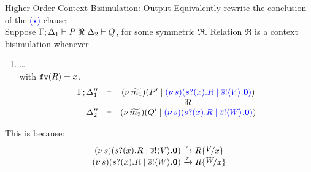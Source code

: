 \documentclass{beamer}
\newcommand{\prcolor}[1]{{\color{blue} #1}}
\begin{document}
	\begin{frame}{Higher-Order Context Bisimulation: Output}
		Equivalently rewrite the conclusion of the \textcolor{blue}{($\star$)} clause:
		\\[2mm]

		Suppose $\Gamma; \Delta_1 \proves P\ \Re\ \Delta_2 \proves Q$, for some symmetric $\Re$. Relation $\Re$ is
		a context bisimulation whenever
		\begin{enumerate}[$(\star)$]
			\item	\dots\\
				 with $\mathtt{fv}(R)=x$, 
				\[
					\begin{array}{rcc}
						\Gamma; \Delta_1'' &\proves& \newsp{\widetilde{m_1}}{P' \Par \prcolor{\newsp{s}{\binp{s}{x} R \Par  \bout{\dual{s}}{V} \inact}}}
						\\
						&&\Re
						\\
						\Delta_2'' &\proves&  \newsp{\widetilde{m_2}}{Q' \Par \prcolor{\newsp{s}{\binp{s}{x} R \Par \bout{\dual{s}}{W} \inact}}}
					\end{array}
				\]
		\end{enumerate}
		This is because:
		\[
			\begin{array}{c}
				\newsp{s}{\binp{s}{x} R \Par \bout{\dual{s}}{V} \inact}
				\by{\tau}
				R \subst{V}{x}
				\\
				\newsp{s}{\binp{s}{x} R \Par \bout{\dual{s}}{W} \inact}
				\by{\tau}
				R \subst{W}{x}
			\end{array}
		\]
	\end{frame}
\end{document}
